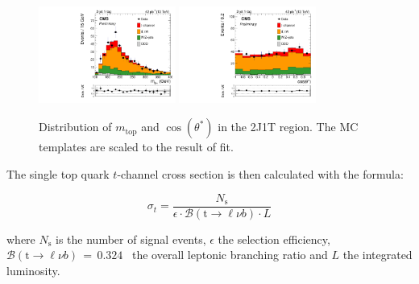 \begin{figure}[!h]
\begin{center}
\includegraphics[angle=00,width=0.4\textwidth]{figures/postfit_topm_incl.pdf}
\includegraphics[angle=00,width=0.4\textwidth]{figures/postfit_costhetastar_incl.pdf}
\caption{\label{fit:scaled} Distribution of $m_{\text{top}}$ and $\cos(\theta^*)$ in the 2J1T region. The MC templates are scaled to the result of fit.}
\end{center}
\end{figure}

The single top quark $t$-channel cross section is then calculated with the formula:

\begin{equation}
\sigma_t = \frac{N_{\mathrm{s}}}{\epsilon \cdot \mathcal{B}(\mathrm{t}\to\ell\nu b) \cdot L}
\label{eq:crosssection}
\end{equation}

where $N_{\mathrm{s}}$ is the number of signal events, $\epsilon$ the selection efficiency, $\mathcal{B}(\mathrm{t}\to\ell\nu b)\, = \, 0.324$~\cite{pdg} the overall leptonic branching ratio and $L$ the integrated luminosity.

